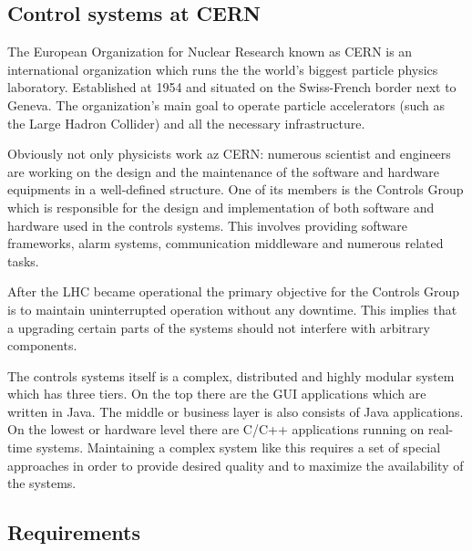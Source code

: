 \subsection{Control systems at CERN}


The European Organization for Nuclear Research known as CERN is an international
organization which runs the the world's biggest particle physics laboratory.
Established at 1954 and situated on the Swiss-French border next to Geneva. The
organization's main goal to operate particle accelerators (such as the Large
Hadron Collider) and all the necessary infrastructure.

Obviously not only physicists work az CERN: numerous scientist and engineers are
working on the design and the maintenance of the software and hardware
equipments in a well-defined structure. One of its members is the Controls Group
which is responsible for the design and implementation of both software and
hardware used in the controls systems. This involves providing software
frameworks, alarm systems, communication middleware and numerous related tasks.

After the LHC became operational the  primary objective for the Controls Group
is to maintain uninterrupted operation without any downtime. This implies that a
upgrading certain parts of the systems should not interfere with arbitrary
components.

The controls systems itself is a complex, distributed and highly modular system
which has three tiers. On the top there are the GUI applications which are
written in Java. The middle or business layer is also consists of Java
applications. On the lowest or hardware level there are C/C++ applications
running on real-time systems. Maintaining a complex system like this requires a
set of special approaches in order to provide desired quality and to maximize
the availability of the systems.


\subsection{Requirements}



